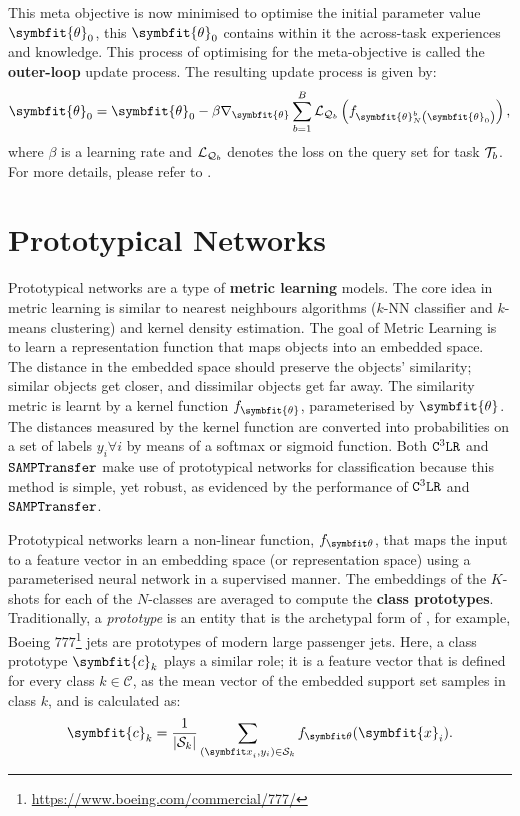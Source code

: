 This meta objective is now minimised to optimise the initial parameter value $\symbfit{\theta}_0$, this $\symbfit{\theta}_0$ contains within it the across-task experiences and knowledge. This process of optimising for the meta-objective is called the \textbf{outer-loop} update process.
The resulting update process is given by:
\begin{equation}
\label{eqn:meta-update}
\symbfit{\theta}_{0}=\symbfit{\theta}_{0}-\beta \nabla_{\symbfit{\theta}} \sum_{b=1}^{B} \mathcal{L}_{\mcQ_{b}}\left(f_{\symbfit{\theta}_{N}^{b}\left(\symbfit{\theta}_{0}\right)}\right),
\end{equation}
where $\beta$ is a learning rate and $\mathcal{L}_{\mathcal{Q}_b}$ denotes the loss on the query set for task $\mathcal{T}_b$.
For more details, please refer to \parencite{Finn2017Model-agnosticNetworks, antoniou2018train}.
\section{Prototypical Networks}\label{ssec:protonets}

Prototypical networks are a type of \textbf{metric learning} models. The core idea in metric learning is similar to nearest neighbours algorithms ($k$-NN classifier and $k$-means clustering) and kernel density estimation. The goal of Metric Learning is to learn a representation function that maps objects into an embedded space. The distance in the embedded space should preserve the objects' similarity; similar objects get closer, and dissimilar objects get far away. The similarity metric is learnt by a kernel function $f_{\symbfit{\theta}}$, parameterised by $\symbfit{\theta}$. The distances measured by the kernel function are converted into probabilities on a set of labels $y_i \forall i$ by means of a softmax or sigmoid function. Both $\texttt{C$^3$LR}$ and $\texttt{SAMPTransfer}$ make use of prototypical networks for classification because this method is simple, yet robust, as evidenced by the performance of $\texttt{C$^3$LR}$ and $\texttt{SAMPTransfer}$.

Prototypical networks learn a non-linear function, $f_{\symbfit \theta}$, that maps the input to a feature vector in an embedding space (or representation space) using a parameterised neural network in a supervised manner. The embeddings of the $K$-shots for each of the $N$-classes are averaged to compute the \textbf{class prototypes}. Traditionally, a \textit{prototype} is an entity that is the archetypal form of , for example, Boeing $777$\footnote{\url{https://www.boeing.com/commercial/777/}} jets are prototypes of modern large passenger jets.
Here, a class prototype $\symbfit{c}_k$ plays a similar role; it is a feature vector that is defined for every class $k \in \mathcal{C}$, as the mean vector of the embedded support set samples in class $k$, and is calculated as:
\begin{equation}
    \symbfit{c}_{k}=\frac{1}{|\mcS_{k}|} \sum_{({\symbfit x}_i, y_i) \in {\mcS_k}} f_{\symbfit \theta}(\symbfit{x}_{i}).
    \label{eqn:fsl-proto-calc}
\end{equation}

